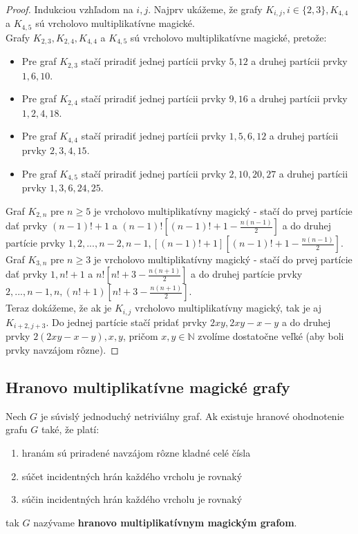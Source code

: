 \begin{proof} Indukciou vzhľadom na $i,j$. Najprv ukážeme, že grafy $K_{i,j}, i \in \{2,3\}, K_{4,4}$ a $K_{4,5}$ sú vrcholovo multiplikatívne magické. \\

Grafy $K_{2,3}, K_{2,4}, K_{4,4}$ a $K_{4,5}$ sú vrcholovo multiplikatívne magické, pretože:
\begin{itemize}
\item Pre graf $K_{2,3}$ stačí priradiť jednej partícii prvky $5, 12$ a druhej partícii prvky $1, 6, 10$.
\item Pre graf $K_{2,4}$ stačí priradiť jednej partícii prvky $9, 16$ a druhej partícii prvky $1, 2, 4, 18$.
\item Pre graf $K_{4,4}$ stačí priradiť jednej partícii prvky $1, 5, 6, 12$ a druhej partícii prvky $2, 3, 4, 15$.
\item Pre graf $K_{4,5}$ stačí priradiť jednej partícii prvky $2, 10, 20, 27$ a druhej partícii prvky $1, 3, 6, 24, 25$.
\end{itemize}

Graf $K_{2,n}$ pre $n \geq 5$ je vrcholovo multiplikatívny magický - stačí do prvej partície dať prvky $(n-1)! + 1$ a $(n-1)! [(n-1)! + 1 - \frac{n(n-1)}{2}]$ a do druhej partície prvky $1, 2, ... , n-2, n-1, [(n-1)! + 1] [(n-1)! + 1 - \frac{n(n-1)}{2}]$. \\

Graf $K_{3,n}$ pre $n \geq 3$ je vrcholovo multiplikatívny magický - stačí do prvej partície dať prvky $1, n! + 1$ a $n! [n! + 3 - \frac{n(n+1)}{2}]$ a do druhej partície prvky $2, ... , n-1, n, (n! + 1) [n! + 3 - \frac{n(n+1)}{2}]$. \\

Teraz dokážeme, že ak je $K_{i,j}$ vrcholovo multiplikatívny magický, tak je aj $K_{i+2,j+3}$. Do jednej partície stačí pridať prvky $2xy, 2xy - x - y$ a do druhej prvky $2(2xy - x - y), x, y$, pričom $x,y \in \mathbb{N}$ zvolíme dostatočne veľké (aby boli prvky navzájom rôzne).
\end{proof}



\subsection{Hranovo multiplikatívne magické grafy}

\begin{definition} Nech $G$ je súvislý jednoduchý netriviálny graf. Ak existuje hranové ohodnotenie grafu $G$ také, že platí:

\begin{enumerate}
\item hranám sú priradené navzájom rôzne kladné celé čísla
\item súčet incidentných hrán každého vrcholu je rovnaký
\item súčin incidentných hrán každého vrcholu je rovnaký
\end{enumerate}

tak $G$ nazývame \textbf{hranovo multiplikatívnym magickým grafom}.
\end{definition} 

